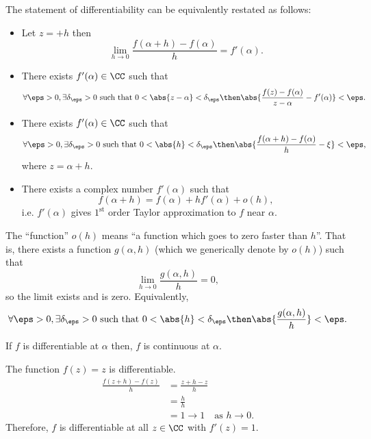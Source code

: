\documentclass[12pt, a4paper]{article}
\begin{document}
\begin{theorem}
    The statement of differentiability can be equivalently restated as follows:
    \begin{itemize}
        \item Let \(z = +h\) then
        \[\lim_{h \to 0} \frac{f(\alpha+h)-f(\alpha)}{h} = f'(\alpha).\]
        \item There exists \(f'(\alpha) \in \CC\) such that 
        \[\forall \eps>0, \exists \delta_{\eps}>0 \text{ such that } 0<\abs{z-\alpha}<\delta_{\eps} \then \abs{\frac{f(z)-f(\alpha)}{z-\alpha} - f'(\alpha)} < \eps.\]
        \item There exists \(f'(\alpha) \in \CC\) such that 
        \[\forall \eps>0, \exists \delta_{\eps}>0 \text{ such that } 0<\abs{h}<\delta_{\eps} \then \abs{\frac{f(\alpha+h)-f(\alpha)}{h} - \xi} < \eps,\]
        where \(z = \alpha+h\).
        \item There exists a complex number \(f'(\alpha)\) such that 
        \[f(\alpha +h) = f(\alpha)+ h f'(\alpha)+o(h),\]
        i.e. \(f'(\alpha)\) gives \(1^{\text{st}}\) order Taylor approximation to \(f\) near \(\alpha\).
    \end{itemize}
\end{theorem}

\begin{mdremark}
    The ``function'' \(o(h)\) means ``a function which goes to zero faster than \(h\)''. That is, there exists a function \(g(\alpha,h)\) (which we generically denote by \(o(h)\)) such that 
    \[\lim_{h \to 0} \frac{g(\alpha,h)}{h} = 0,\]
    so the limit exists and is zero. Equivalently, 
    \[\forall \eps>0, \exists \delta_{\eps}>0 \text{ such that } 0<\abs{h}<\delta_{\eps} \then \abs{\frac{g(\alpha,h)}{h}}<\eps.\]
\end{mdremark}

\begin{mdprop}
    If \(f\) is differentiable at \(\alpha\) then, \(f\) is continuous at \(\alpha\).
\end{mdprop}

\begin{example}
    The function \(f(z)=z\) is differentiable.
    \[\begin{aligned}
        \frac{f(z+h)-f(z)}{h} &= \frac{z+h-z}{h} \\
        &= \frac{h}{h} \\
        &=1 \to 1 \quad \text{as } h\to 0.
    \end{aligned}\]
    Therefore, \(f\) is differentiable at all \(z \in \CC\) with \(f'(z)=1\).
\end{example}
\end{document}
